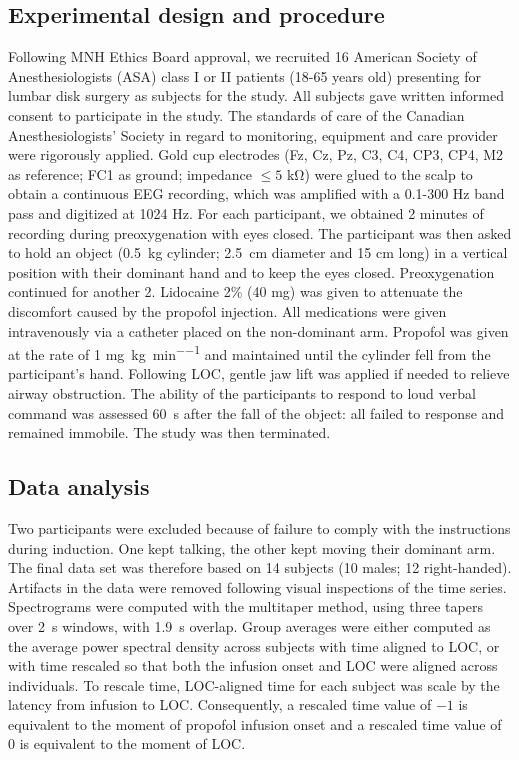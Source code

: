 \subsection{Experimental design and procedure}
Following MNH Ethics Board approval, we recruited 16 American Society of Anesthesiologists (ASA) class I or II patients (18-65 years old) presenting for lumbar disk surgery as subjects for the study. All subjects gave written informed consent to participate in the study. The standards of care of the Canadian Anesthesiologists' Society in regard to monitoring, equipment and care provider were rigorously applied. Gold cup electrodes (Fz, Cz, Pz, C3, C4, CP3, CP4, M2 as reference; FC1 as ground; impedance $\le5$ \unit{\kilo\ohm}) were glued to the scalp to obtain a continuous EEG recording, which was amplified with a 0.1-300 \unit{\hertz} band pass and digitized at 1024 \unit{\hertz}. For each participant, we obtained 2 minutes of recording during preoxygenation with eyes closed. The participant was then asked to hold an object (\qty{0.5}{\kilo\gram} cylinder; \qty{2.5}{\centi\meter} diameter and 15 \unit{\centi\meter} long) in a vertical position with their dominant hand and to keep the eyes closed. Preoxygenation continued for another \qty{2}{\min}. Lidocaine 2\% (40 \unit{\milli\gram}) was given to attenuate the discomfort caused by the propofol injection. All medications were given intravenously via a catheter placed on the non-dominant arm. Propofol was given at the rate of 1 \unit{\milli\gram\per\kilo\gram\per\minute} and maintained until the cylinder fell from the participant’s hand. Following LOC, gentle jaw lift was applied if needed to relieve airway obstruction. The ability of the participants to respond to loud verbal command was assessed \qty{60}{\second} after the fall of the object: all failed to response and remained immobile. The study was then terminated. 

\subsection{Data analysis}
Two participants were excluded because of failure to comply with the instructions during induction. One kept talking, the other kept moving their dominant arm. The final data set was therefore based on 14 subjects (10 males; 12 right-handed). Artifacts in the data were removed following visual inspections of the time series. Spectrograms were computed with the multitaper method, using three tapers over \qty{2}{\second} windows, with \qty{1.9}{\second} overlap. Group averages were either computed as the average power spectral density across subjects with time aligned to LOC, or with time rescaled so that both the infusion onset and LOC were aligned across individuals. To rescale time, LOC-aligned time for each subject was scale by the latency from infusion to LOC. Consequently, a rescaled time value of $-1$ is equivalent to the moment of propofol infusion onset and a rescaled time value of 0 is equivalent to the moment of LOC. 

